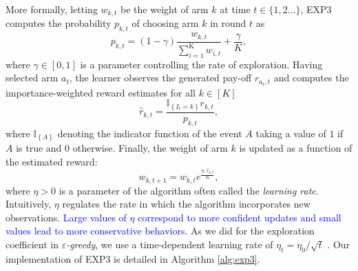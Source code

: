 \documentclass[preprint,12pt]{elsarticle}
\begin{document}
	More formally, letting $w_{k,t}$ be the weight of arm $k$ at time $t \in \{1,2 ...\}$, EXP3 computes the probability $p_{k,t}$ of choosing arm $k$ in round $t$ as
	\begin{equation}
	\label{eq:exp3_prob}
	p_{k,t} = (1-\gamma) \frac{w_{k,t}}{\sum_{i=1}^{\text{K}}w_{i,t}} + \frac{\gamma}{K},
	\nonumber
	\end{equation}
	where $\gamma\in[0,1]$ is a parameter controlling the rate of exploration.
	Having selected arm $a_t$, the learner observes the generated pay-off $r_{a_t,t}$ and computes the importance-weighted reward estimates for all $k\in[K]$
	\begin{equation}
	\label{eq:exp3_estimated_reward}
	\widehat{r}_{k,t} = \frac{\mathbb{I}_{\left\{I_t = k\right\}}r_{k,t}}{p_{k,t}},
	\nonumber
	\end{equation}
	where $\mathbb{I}_{\left\{A \right\}}$ denoting the indicator function of the event $A$ taking a value of $1$ if $A$ is true and $0$ otherwise.
	Finally, the weight of arm $k$ is updated as a function of the estimated reward:
	\begin{equation}
	\label{eq:exp3_weights}
	w_{k,t+1}=w_{k,t} e^{\frac{\eta \cdot \widehat{r}_{k,t}}{K}},
	\nonumber
	\end{equation}	
	where $\eta>0$ is a parameter of the algorithm often called the \emph{learning rate}. Intuitively, $\eta$ regulates the rate in which the algorithm incorporates new observations. \textcolor{blue}{Large values of $\eta$ correspond to more confident updates and small values lead to more conservative behaviors}. As we did for the exploration coefficient in \emph{$\varepsilon$-greedy}, we use a time-dependent learning rate of $\eta_t = \eta_0 / \sqrt{t}$ \cite{auer2002finite}. Our implementation of EXP3 is detailed in Algorithm \ref{alg:exp3}.
	
\end{document}
